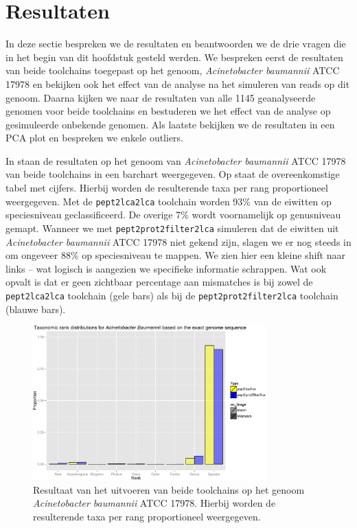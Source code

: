 \section{Resultaten} 

In deze sectie bespreken we de resultaten en beantwoorden we de drie vragen die
in het begin van dit hoofdstuk gesteld werden. We bespreken eerst de resultaten
van beide toolchains toegepast op het genoom, \textit{Acinetobacter baumannii}
ATCC 17978 en bekijken ook het effect van de analyse na het simuleren van reads
op dit genoom. Daarna kijken we naar de resultaten van alle 1145 geanalyseerde
genomen voor beide toolchains en bestuderen we het effect van de analyse op
gesimuleerde onbekende genomen. Als laatste bekijken we de resultaten in een PCA
plot en bespreken we enkele outliers.

In  staan de resultaten op het genoom van
\textit{Acinetobacter baumannii} ATCC 17978 van beide toolchains in een barchart
weergegeven. Op  staat de overeenkomstige tabel met
cijfers. Hierbij worden de resulterende taxa per rang proportioneel weergegeven.
Met de \texttt{pept2lca2lca} toolchain worden 93\% van de eiwitten op
speciesniveau geclassificeerd. De overige 7\% wordt voornamelijk op genusniveau
gemapt. Wanneer we met \texttt{pept2prot2filter2lca} simuleren dat de eiwitten
uit \textit{Acinetobacter baumannii} ATCC 17978 niet gekend zijn, slagen we er
nog steeds in om ongeveer 88\% op speciesniveau te mappen. We zien hier een
kleine shift naar links -- wat logisch is aangezien we specifieke informatie
schrappen. Wat ook opvalt is dat er geen zichtbaar percentage aan mismatches is
bij zowel de \texttt{pept2lca2lca} toolchain (gele bars) als bij de
\texttt{pept2prot2filter2lca} toolchain (blauwe bars).

\begin{figure}
	\centering 
	\includegraphics[width=0.80\textwidth]{includes/barchart.pdf}
	\caption{Resultaat van het uitvoeren van beide toolchains op het genoom
	\textit{Acinetobacter baumannii} ATCC 17978. Hierbij worden de resulterende
	taxa per rang proportioneel weergegeven.} 
	\label{fig:barchart}
\end{figure}

